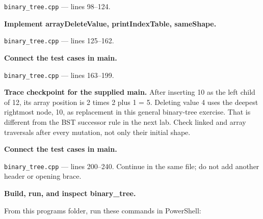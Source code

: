 \texttt{binary\_tree.cpp} --- lines 98--124.






\tcbbreak

\begin{utpsteps}\setcounter{enumi}{4}\item \textbf{Implement arrayDeleteValue, printIndexTable, sameShape.}\end{utpsteps}

\texttt{binary\_tree.cpp} --- lines 125--162.




\tcbbreak

\begin{utpsteps}\setcounter{enumi}{5}\item \textbf{Connect the test cases in main.}\end{utpsteps}

\texttt{binary\_tree.cpp} --- lines 163--199.

\textbf{Trace checkpoint for the supplied main.} After inserting 10 as the left child of 12, its array position is 2 times 2 plus 1 = 5. Deleting value 4 uses the deepest rightmost node, 10, as replacement in this general binary-tree exercise. That is different from the BST successor rule in the next lab. Check linked and array traversals after every mutation, not only their initial shape.




\tcbbreak

\begin{utpsteps}\setcounter{enumi}{6}\item \textbf{Connect the test cases in main.}\end{utpsteps}

\texttt{binary\_tree.cpp} --- lines 200--240. Continue in the same file; do not add another header or opening brace.




\tcbbreak

\textbf{Build, run, and inspect binary\_tree.}

From this program\textquotesingle s folder, run these commands in PowerShell:

